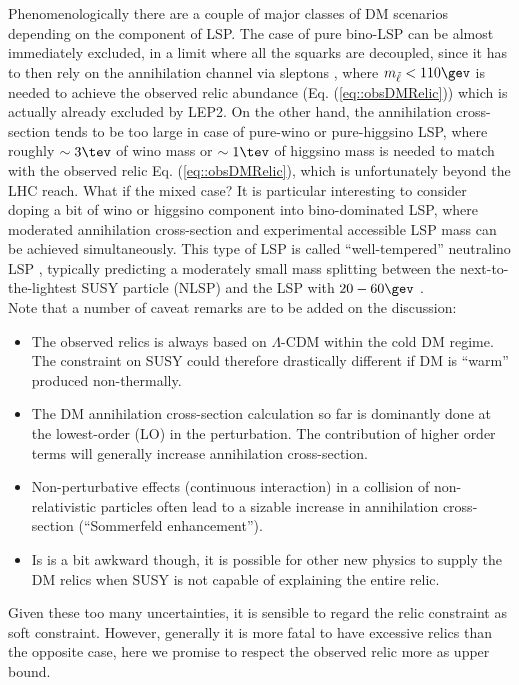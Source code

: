 Phenomenologically there are a couple of major classes of DM scenarios depending on the component of LSP.
The case of pure bino-LSP can be almost immediately excluded, 
in a limit where all the squarks are decoupled, 
since it has to then rely on the annihilation channel via sleptons \cite{SUSYDM_WTN}, 
where 
$m_{\tlep}<110\gev$ is needed to achieve the observed relic abundance (Eq. (\ref{eq::obsDMRelic})) which is actually already excluded by LEP2. 
%
On the other hand, 
the annihilation cross-section tends to be too large in case of pure-wino or pure-higgsino LSP, where roughly $\sim 3\tev$ of wino mass or $\sim 1\tev$ of higgsino mass is needed to match with the observed relic Eq. (\ref{eq::obsDMRelic}), which is unfortunately beyond the LHC reach. 
%
What if the mixed case? It is particular interesting to consider doping a bit of wino or higgsino component into bino-dominated LSP, where moderated annihilation cross-section and experimental accessible LSP mass can be achieved simultaneously. This type of LSP is called ``well-tempered'' neutralino LSP \cite{SUSYDM_WTN}, typically predicting a moderately small mass splitting between the next-to-the-lightest SUSY particle (NLSP) and the LSP with $20-60\gev$ \cite{SUSYDM_BWCA,Bramante2016}. \\

\noindent Note that a number of caveat remarks are to be added on the discussion:
\begin{itemize}
\item The observed relics is always based on $\Lambda$-CDM within the cold DM regime. The constraint on SUSY could therefore drastically different if DM is ``warm'' produced non-thermally. 
\item The DM annihilation cross-section calculation so far is dominantly done at the lowest-order (LO) in the perturbation. The contribution of higher order terms will generally increase annihilation cross-section. 
\item Non-perturbative effects (continuous interaction) in a collision of non-relativistic particles often lead to a sizable increase in annihilation cross-section (``Sommerfeld enhancement''). 
\item Is is a bit awkward though, it is possible for other new physics to supply the DM relics when SUSY is not capable of explaining the entire relic.
\end{itemize}
Given these too many uncertainties, it is sensible to regard the relic constraint as soft constraint. However, generally it is more fatal to have excessive relics than the opposite case, here we promise to respect the observed relic more as upper bound. \\

